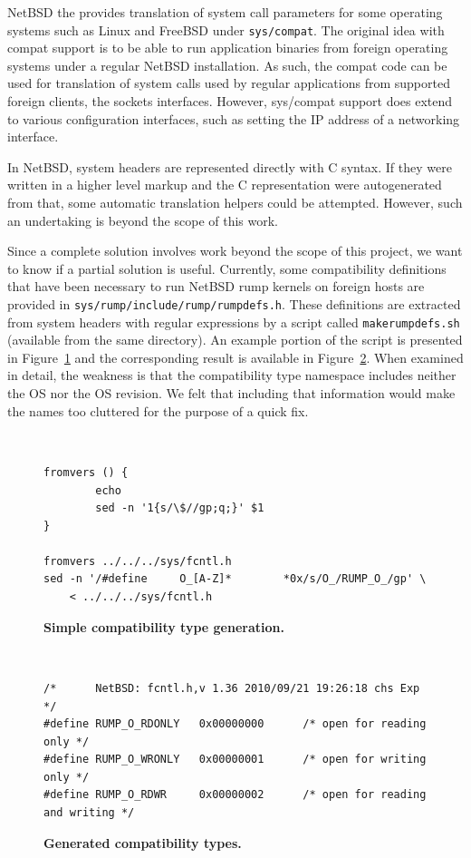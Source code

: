 NetBSD the provides translation of system call parameters for some operating
systems such as Linux and FreeBSD under \texttt{sys/compat}.  The original
idea with compat support is to be able to run application binaries
from foreign operating systems under a regular NetBSD installation.
As such, the compat code can be used for translation of system calls
used by regular applications from supported foreign clients, \eg
the sockets interfaces.  However,
sys/compat support does extend to various configuration interfaces,
such as setting the IP address of a networking interface.

In NetBSD, system headers are represented directly with C syntax.
If they were written in a higher level markup and the C representation
were autogenerated from that, some automatic translation helpers
could be attempted.  However, such an undertaking is beyond the
scope of this work.

Since a complete solution involves work beyond the scope of this
project, we want to know if a partial solution is useful.  Currently,
some compatibility definitions that have been necessary to run
NetBSD rump kernels on foreign hosts are provided in
\texttt{sys/rump/include/rump/rumpdefs.h}.  These definitions are
extracted from system headers with regular expressions by a script
called \texttt{makerumpdefs.sh} (available from the same directory).
An example portion of the script is presented in
Figure~\ref{fig:makerumpdefs} and the corresponding result is
available in Figure~\ref{fig:rumpdefs}.  When examined in detail,
the weakness is that the compatibility type namespace includes neither
the OS nor the OS revision.  We felt that including that information
would make the names too cluttered for the purpose of a quick fix.

\begin{figure}[t]
{\tt \scriptsize
\begin{verbatim}
fromvers () {
        echo
        sed -n '1{s/\$//gp;q;}' $1
}

fromvers ../../../sys/fcntl.h
sed -n '/#define     O_[A-Z]*        *0x/s/O_/RUMP_O_/gp' \
    < ../../../sys/fcntl.h
\end{verbatim}}
\caption[Simple compatibility type generation]{
\textbf{Simple compatibility type generation.}}
\label{fig:makerumpdefs}
\end{figure}

\begin{figure}[t]
{\tt \scriptsize
\begin{verbatim}
/*      NetBSD: fcntl.h,v 1.36 2010/09/21 19:26:18 chs Exp      */
#define RUMP_O_RDONLY   0x00000000      /* open for reading only */
#define RUMP_O_WRONLY   0x00000001      /* open for writing only */
#define RUMP_O_RDWR     0x00000002      /* open for reading and writing */
\end{verbatim}}
\caption[Generated compatibility types]{
\textbf{Generated compatibility types.}}
\label{fig:rumpdefs}
\end{figure}

